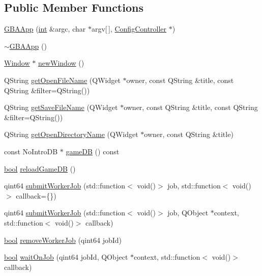 \subsection*{Public Member Functions}
\begin{DoxyCompactItemize}
\item 
\mbox{\hyperlink{class_q_g_b_a_1_1_g_b_a_app_a00713e773289a850303d8954b0ebefbc}{G\+B\+A\+App}} (\mbox{\hyperlink{ioapi_8h_a787fa3cf048117ba7123753c1e74fcd6}{int}} \&argc, char $\ast$argv\mbox{[}$\,$\mbox{]}, \mbox{\hyperlink{class_q_g_b_a_1_1_config_controller}{Config\+Controller}} $\ast$)
\item 
\mbox{\hyperlink{class_q_g_b_a_1_1_g_b_a_app_a74f49233dd4c7588df98dc7adbbcf031}{$\sim$\+G\+B\+A\+App}} ()
\item 
\mbox{\hyperlink{class_q_g_b_a_1_1_window}{Window}} $\ast$ \mbox{\hyperlink{class_q_g_b_a_1_1_g_b_a_app_aa1eef91286be508318f3416141f427a7}{new\+Window}} ()
\item 
Q\+String \mbox{\hyperlink{class_q_g_b_a_1_1_g_b_a_app_a44b0a376cc16d17e904f5d750a854380}{get\+Open\+File\+Name}} (Q\+Widget $\ast$owner, const Q\+String \&title, const Q\+String \&filter=Q\+String())
\item 
Q\+String \mbox{\hyperlink{class_q_g_b_a_1_1_g_b_a_app_a9a8900559fe370b6143a0f4be535fa16}{get\+Save\+File\+Name}} (Q\+Widget $\ast$owner, const Q\+String \&title, const Q\+String \&filter=Q\+String())
\item 
Q\+String \mbox{\hyperlink{class_q_g_b_a_1_1_g_b_a_app_a6456a6d7b74fe7fdfc6a92205e6c1b0b}{get\+Open\+Directory\+Name}} (Q\+Widget $\ast$owner, const Q\+String \&title)
\item 
const No\+Intro\+DB $\ast$ \mbox{\hyperlink{class_q_g_b_a_1_1_g_b_a_app_a688bb31cfaac66a56b64d37dd8004cc7}{game\+DB}} () const
\item 
\mbox{\hyperlink{libretro_8h_a4a26dcae73fb7e1528214a068aca317e}{bool}} \mbox{\hyperlink{class_q_g_b_a_1_1_g_b_a_app_a253cf2c502553990bf498bf91433d52a}{reload\+Game\+DB}} ()
\item 
qint64 \mbox{\hyperlink{class_q_g_b_a_1_1_g_b_a_app_ad2506b0b8187a038933dc00a4fb0de88}{submit\+Worker\+Job}} (std\+::function$<$ void()$>$ job, std\+::function$<$ void()$>$ callback=\{\})
\item 
qint64 \mbox{\hyperlink{class_q_g_b_a_1_1_g_b_a_app_a70013367ed3d734e7b8a519b9de88b83}{submit\+Worker\+Job}} (std\+::function$<$ void()$>$ job, Q\+Object $\ast$context, std\+::function$<$ void()$>$ callback)
\item 
\mbox{\hyperlink{libretro_8h_a4a26dcae73fb7e1528214a068aca317e}{bool}} \mbox{\hyperlink{class_q_g_b_a_1_1_g_b_a_app_a71e13f90bf87f7d826710353392f33b5}{remove\+Worker\+Job}} (qint64 job\+Id)
\item 
\mbox{\hyperlink{libretro_8h_a4a26dcae73fb7e1528214a068aca317e}{bool}} \mbox{\hyperlink{class_q_g_b_a_1_1_g_b_a_app_a7785f5a8ef24ecc09be362ce641f24dd}{wait\+On\+Job}} (qint64 job\+Id, Q\+Object $\ast$context, std\+::function$<$ void()$>$ callback)
\end{DoxyCompactItemize}
